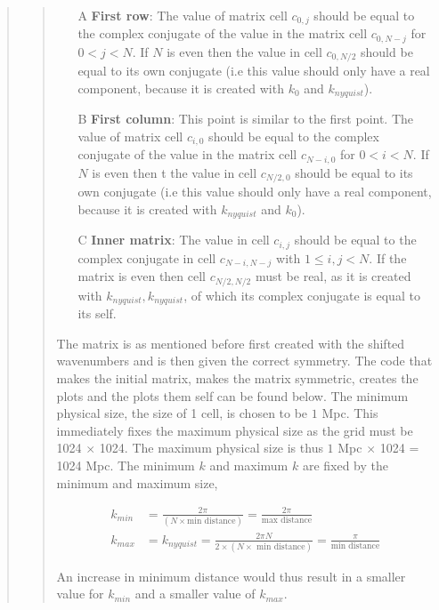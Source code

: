 \begin{quote}
\begin{quote}
\begin{enumerate}
\item[A] \textbf{First row}: The value of matrix cell $c_{0,j}$ should be equal to the complex conjugate of the value in the matrix cell $c_{0,N-j}$ for $ 0 < j< N$. If $N$ is even then  the  value in cell $c_{0,N/2}$ should be equal to its own conjugate (i.e this value should only have a real component, because it is created with $k_0$ and $k_{nyquist}$).
\item[B] \textbf{First column}: This point is similar to the first point. The value of matrix cell $c_{i,0}$ should be equal to the complex conjugate of the value in the matrix cell $c_{N-i,0}$ for $0 < i < N$. If $N$ is even then t the  value in cell $c_{N/2,0}$ should be equal to its own conjugate (i.e this value should only have a real component, because it is created with $k_{nyquist}$ and $k_{0}$).
\item[C] \textbf{Inner matrix}: The value in cell $c_{i,j}$ should be equal to the complex conjugate in cell $c_{N-i,N-j}$ with $1 \leq i, j < N$. If the matrix is even then cell $c_{N/2,N/2}$ must be real, as it is created with $k_{nyquist}, k_{nyquist}$, of which its complex conjugate is equal to its self. %
\end{enumerate}

The matrix is as mentioned before first created with the shifted wavenumbers and is then given the correct symmetry. The code that makes the initial matrix, makes the matrix symmetric, creates the plots and the plots them self can be found below. The minimum physical size, the size of 1 cell, is chosen to be $ 1$ Mpc. This immediately fixes the maximum physical size as the grid must be 1024 $\times$ 1024. The maximum physical size is thus $ 1$ Mpc $ \times $ 1024 = 1024 Mpc. The minimum $k$ and maximum $k$ are fixed by the minimum and maximum size,

\begin{align}
k_{min} &= \frac{2 \pi}{ ( N \times \text{min distance} )} = \frac{2 \pi }{\text{max distance}} \\
k_{max} &= k_{nyquist} = \frac{2 \pi N}{ 2 \times ( N \times \text{ min distance} )} = \frac{ \pi}{\text{min distance}}
\end{align}

An increase in minimum distance would thus result in a smaller value for $k_{min}$ and a smaller value of $k_{max}$.


\end{quote}
\end{quote}
